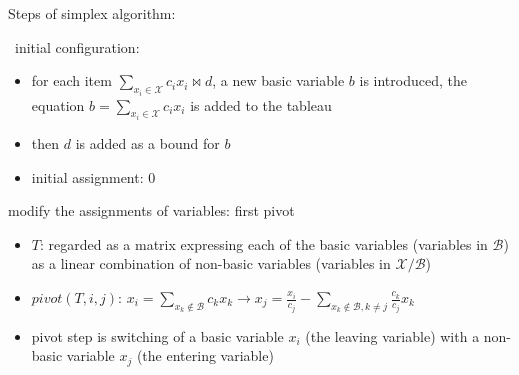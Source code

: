 \documentclass[aspectratio=169%
,serif,mathserif]{beamer}
\begin{document}
\begin{frame}
	Steps of simplex algorithm:
	\begin{block}
		~initial configuration:
		\begin{itemize}
			\item for each item $\sum_{x_{i} \in \mathcal{X}} c_{i} x_{i} \bowtie d$, a
			new basic variable $b$ is introduced, the equation $b = \sum_{x_{i} \in \mathcal{X}} c_{i} x_{i}$ is added to the tableau
			\item then $d$ is added as a bound for $b$
			\item initial assignment: 0 
		\end{itemize}

	\end{block}	

\end{frame}



\begin{frame}
	modify the assignments of variables: first pivot
	\begin{itemize}
		\item $T$:  regarded as a matrix expressing each of the basic
		variables (variables in $\mathcal{B}$) as a linear combination of non-basic variables (variables
		in $\mathcal{X} / \mathcal{B}$)
		\item $pivot(T, i, j)$: $x_{i}=\sum_{x_{k} \notin \mathcal{B}} c_{k} x_{k} \to x_{j}=\frac{x_{i}}{c_{j}}-\sum_{x_{k} \notin \mathcal{B}, k \neq j} \frac{c_{k}}{c_{j}} x_{k}$ 
		\item pivot step is switching of a basic variable $x_i$ (the leaving variable) with a non-basic variable
		$x_j$ (the entering variable)
	\end{itemize}
\end{frame}
\end{document}
